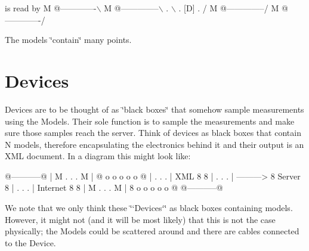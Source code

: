 \begin{DoxyCode}
    is read by
M @-------------\(\backslash\)
M @--------------\(\backslash\)
.                 \(\backslash\)
.                 [D]
.                 /
M @--------------/
M @-------------/
\end{DoxyCode}
 The models \char`\"{}contain\char`\"{} many points.\hypertarget{index_Devices}{}\section{Devices}\label{index_Devices}
Devices are to be thought of as \char`\"{}black boxes\char`\"{} that somehow sample measurements using the {\ttfamily Models}. Their sole function is to sample the measurements and make sure those samples reach the server. Think of devices as black boxes that contain {\ttfamily N} models, therefore encapsulating the electronics behind it and their output is an X\+ML document. In a diagram this might look like\+:


\begin{DoxyCode}
@-----------@
| M . . . M |            @ o o o o o @
| . .     . |    XML     8           8
| .   .   . | ---------> 8  Server   8
| .     . . |  Internet  8           8
| M . . . M |            8 o o o o o @
@-----------@
\end{DoxyCode}


We note that we only think these \char`\"{}`\+Devices`\char`\"{} as black boxes containing models. However, it might not (and it will be most likely) that this is not the case physically; the {\ttfamily Models} could be scattered around and there are cables connected to the {\ttfamily Device}. 